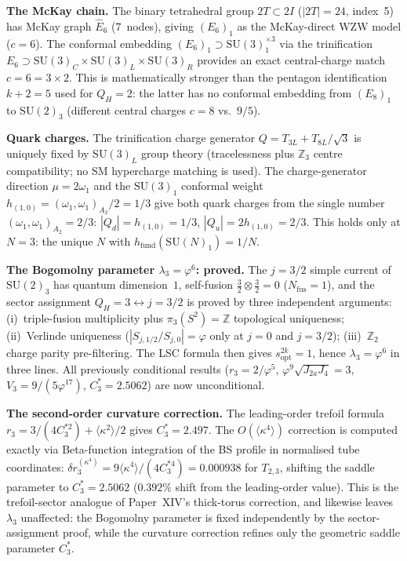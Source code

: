 \documentclass[11pt,a4paper]{article}
\newcommand{\vp}{\varphi}
\newcommand{\twoI}{2I}
\begin{document}
\textbf{The McKay chain.}
The binary tetrahedral group $2T\subset\twoI$ ($|2T|=24$, index~5)
has McKay graph $\widehat{E}_6$ (7~nodes), giving $(E_6)_1$ as the
McKay-direct WZW model ($c=6$).
The conformal embedding $(E_6)_1\supset\mathrm{SU}(3)_1^{\times 3}$
via the trinification $E_6\supset\mathrm{SU}(3)_C\times\mathrm{SU}(3)_L\times\mathrm{SU}(3)_R$
provides an exact central-charge match $c=6=3\times 2$.
This is mathematically stronger than the pentagon identification
$k+2=5$ used for $Q_H=2$: the latter has no conformal embedding
from $(E_8)_1$ to $\mathrm{SU}(2)_3$ (different central charges $c=8$ vs.\ $9/5$).

\textbf{Quark charges.}
The trinification charge generator $Q=T_{3L}+T_{8L}/\!\sqrt{3}$
is uniquely fixed by $\mathrm{SU}(3)_L$ group theory (tracelessness plus
$\mathbb{Z}_3$ centre compatibility; no SM hypercharge matching is used).
The charge-generator direction $\mu=2\omega_1$ and the $\mathrm{SU}(3)_1$
conformal weight $h_{(1,0)}=(\omega_1,\omega_1)_{A_2}/2=1/3$
give both quark charges from the single number
$(\omega_1,\omega_1)_{A_2}=2/3$:
$|Q_d|=h_{(1,0)}=1/3$, $|Q_u|=2h_{(1,0)}=2/3$.
This holds only at $N=3$: the unique $N$ with
$h_{\mathrm{fund}}(\mathrm{SU}(N)_1)=1/N$.

\textbf{The Bogomolny parameter $\lambda_3=\vp^6$: proved.}
The $j=3/2$ simple current of $\mathrm{SU}(2)_3$ has quantum dimension~$1$,
self-fusion $\tfrac{3}{2}\otimes\tfrac{3}{2}=0$ ($N_{\mathrm{fus}}=1$),
and the sector assignment $Q_H=3\leftrightarrow j=3/2$ is proved
by three independent arguments:
(i)~triple-fusion multiplicity plus $\pi_3(S^2)=\mathbb{Z}$
topological uniqueness;
(ii)~Verlinde uniqueness ($|S_{j,1/2}/S_{j,0}|=\vp$ only at
$j=0$ and $j=3/2$);
(iii)~$\mathbb{Z}_2$ charge parity pre-filtering.
The LSC formula then gives $s_{\mathrm{opt}}^{2k}=1$,
hence $\lambda_3=\vp^6$ in three lines.
All previously conditional results ($r_3=2/\vp^5$,
$\vp^9\sqrt{J_{2a}J_4}=3$, $V_3=9/(5\vp^{17})$, $C_3^*=2.5062$)
are now unconditional.

\textbf{The second-order curvature correction.}
The leading-order trefoil formula $r_3 = 3/(4C_3^{*2})+\langle\kappa^2\rangle/2$
gives $C_3^*=2.497$. The $O(\langle\kappa^4\rangle)$ correction is computed
exactly via Beta-function integration of the BS profile in normalised tube
coordinates: $\delta r_3^{(\kappa^4)} = 9\langle\kappa^4\rangle/(4 C_3^{*4})
= 0.000938$ for $T_{2,3}$, shifting the saddle parameter to
$C_3^*=2.5062$ ($0.392\%$ shift from the leading-order value). This is the
trefoil-sector analogue of Paper~XIV's thick-torus correction, and likewise
leaves $\lambda_3$ unaffected: the Bogomolny parameter is fixed independently
by the sector-assignment proof, while the curvature correction refines only
the geometric saddle parameter $C_3^*$.
\end{document}
